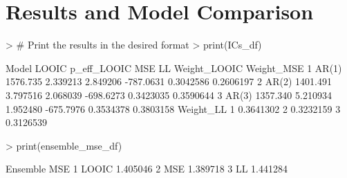 \documentclass{article}
\begin{document}
\section{Results and Model Comparison}

\begin{Schunk}
\begin{Sinput}
> # Print the results in the desired format
> print(ICs_df)
\end{Sinput}
\begin{Soutput}
  Model    LOOIC p_eff_LOOIC      MSE        LL Weight_LOOIC Weight_MSE
1 AR(1) 1576.735    2.339213 2.849206 -787.0631    0.3042586  0.2606197
2 AR(2) 1401.491    3.797516 2.068039 -698.6273    0.3423035  0.3590644
3 AR(3) 1357.340    5.210934 1.952480 -675.7976    0.3534378  0.3803158
  Weight_LL
1 0.3641302
2 0.3232159
3 0.3126539
\end{Soutput}
\begin{Sinput}
> print(ensemble_mse_df)
\end{Sinput}
\begin{Soutput}
  Ensemble      MSE
1    LOOIC 1.405046
2      MSE 1.389718
3       LL 1.441284
\end{Soutput}
\end{Schunk}
\end{document}
